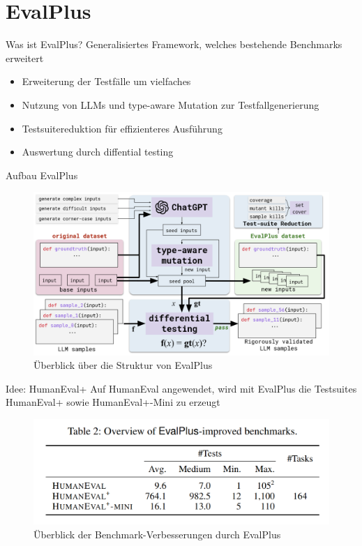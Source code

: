 \documentclass{beamer}              %
\begin{document}
\section{EvalPlus}
\begin{frame}{Was ist EvalPlus?}
Generalisiertes Framework, welches bestehende Benchmarks erweitert\cite{liu2024your}
\begin{itemize}
    \item Erweiterung der Testfälle um vielfaches
    \item Nutzung von LLMs und type-aware Mutation zur Testfallgenerierung
    \item Testsuitereduktion für effizienteres Ausführung
    \item Auswertung durch diffential testing\cite{mckeeman1998differential}
\end{itemize}
\end{frame}

\begin{frame}{Aufbau EvalPlus}
    \begin{figure}
        \centering
        \includegraphics[width=0.8\paperwidth]{images/overviewEplus.png}
        \caption{Überblick über die Struktur von EvalPlus\cite{chen2021evaluating}}
    \end{figure}
\end{frame}

\begin{frame}{Idee: HumanEval+}
Auf HumanEval angewendet, wird mit EvalPlus die Testsuites HumanEval+ sowie HumanEval+-Mini zu erzeugt
    \begin{figure}
        \centering
        \includegraphics[width=0.6\paperwidth]{images/humanevalbenchmarkbulk.png}
        \caption{Überblick der Benchmark-Verbesserungen durch EvalPlus\cite{liu2024your}}
    \end{figure}
\end{frame}
\end{document}
